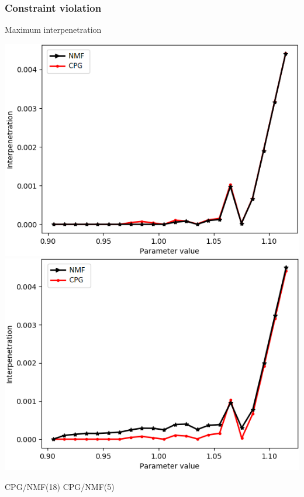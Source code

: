 \begin{frame}\frametitle{Constraint violation}
	Maximum interpenetration
	\medskip
	
	\begin{center}
		\includegraphics[width=.45\textwidth]{./images/contact/interp_second.png}
		\includegraphics[width=.45\textwidth]{./images/contact/interp_third.png}
	\end{center}
	\begin{center}
		\small{ CPG/NMF(18)\hspace{2.8cm} CPG/NMF(5)}
	\end{center}
\end{frame}


